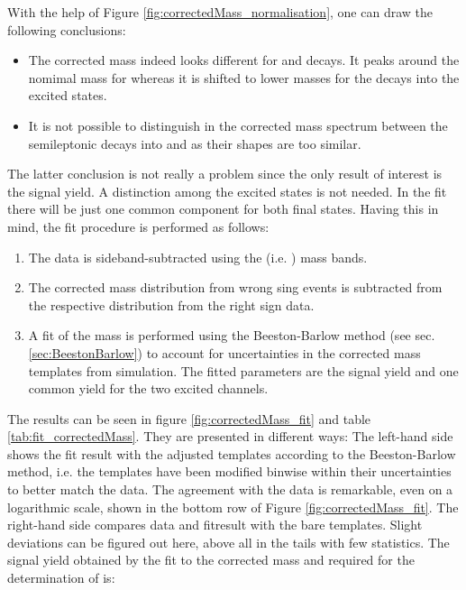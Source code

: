 With the help of Figure \ref{fig:correctedMass_normalisation}, one can draw the following conclusions:
\begin{itemize}
    \item The corrected \pKpi\mun mass indeed looks different for \LbToLcmunu and \decay{\Lb}{\Lcstar\mun\neumb} decays.
          It peaks around the nomimal \Lb mass for \LbToLcmunu whereas it is shifted to lower masses for the decays into the excited \Lcstar states. 
    \item It is not possible to distinguish in the \Lb corrected mass spectrum between the semileptonic \Lb decays into  and  as their shapes are too similar.
\end{itemize}
The latter conclusion is not really a problem since the only result of interest is the \LbToLcmunu signal yield. 
A distinction among the excited states is not needed.
In the fit there will be just one common component for both final states.
Having this in mind, the fit procedure is performed as follows:
\begin{enumerate}
    \item The data is sideband-subtracted using the \pKpi (i.e. \Lc) mass bands.
    \item The corrected \pKpi\mun mass distribution from wrong sing events is subtracted from the respective distribution from the right sign data.
    \item A fit of the \pKpi\mun mass is performed using the Beeston-Barlow method (see sec. \ref{sec:BeestonBarlow}) to account for uncertainties in the corrected mass templates from simulation. The fitted parameters are the \Lc signal yield and one common yield for the two excited \Lcstar channels.
\end{enumerate}
The results can be seen in figure \ref{fig:correctedMass_fit} and table \ref{tab:fit_correctedMass}. 
They are presented in different ways:
The left-hand side shows the fit result with the adjusted templates according to the Beeston-Barlow method, i.e. the templates have been modified binwise within their uncertainties to better match the data.
The agreement with the data is remarkable, even on a logarithmic scale, shown in the bottom row of Figure \ref{fig:correctedMass_fit}.
The right-hand side compares data and fitresult with the bare templates.
Slight deviations can be figured out here, above all in the tails with few statistics.
The \LbToLcmunu signal yield \NLc obtained by the fit to the corrected \pKpi\mun mass and required for the determination of \R is:
